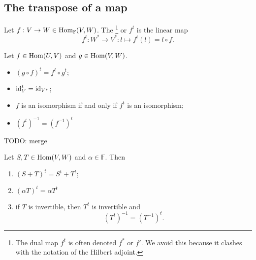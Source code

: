 \subsection{The transpose of a map}
\begin{definition}
Let $f:V\to W \in \operatorname{Hom}_{\mathbb{F}}(V,W)$. The \footnote{The dual map $f^t$ is often denoted $f^*$ or $f'$. We avoid this because it clashes with the notation of the Hilbert adjoint.} or  $f^t$ is the linear map
\[ f^t:W^* \to V^*: l\mapsto f^t(l) = l\circ f. \]
\end{definition}
\begin{lemma}
Let $f\in \operatorname{Hom}(U,V)$ and $g\in \operatorname{Hom}(V,W)$.
\begin{itemize}
\item $(g\circ f)^t = f^t\circ g^t$;
\item $\operatorname{id}^t_V = \operatorname{id}_{{V}^*}$;
\item $f$ is an isomorphism \textup{if and only if} $f^t$ is an isomorphism;
\item $(f^t)^{-1} = (f^{-1})^t$ 
\end{itemize}
\end{lemma}
TODO: merge
\begin{lemma}
Let $S,T\in\operatorname{Hom}(V,W)$ and $\alpha\in\mathbb{F}$. Then
\begin{enumerate}
\item $(S+T)^t = S^t+T^t$;
\item $(\alpha T)^t = \alpha T^t$
\item if $T$ is invertible, then $T^t$ is invertible and
\[ (T^t)^{-1} = (T^{-1})^t. \]
\end{enumerate}
\end{lemma}

